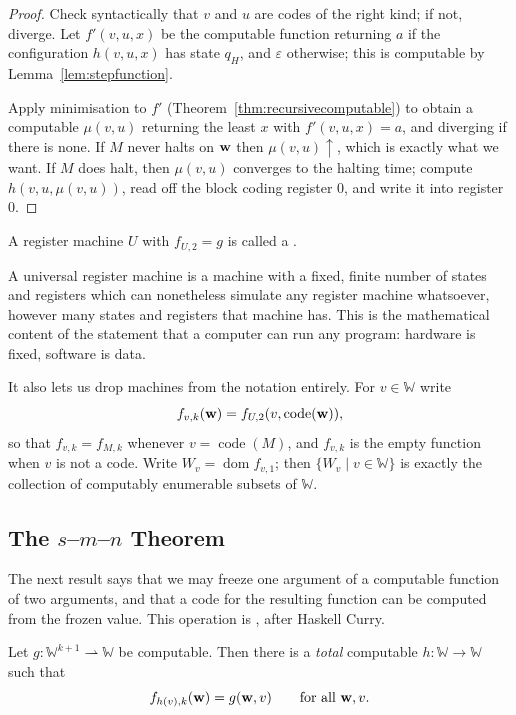 \documentclass[a4paper]{scrartcl}
\newcommand{\WW}{\mathbb{W}}
\newcommand{\dom}{\operatorname{dom}}
\newcommand{\code}{\operatorname{code}}
\newcommand{\eps}{\varepsilon}
\begin{document}
\begin{proof}
	Check syntactically that $v$ and $u$ are codes of the right kind; if not, diverge. Let $f'(v,u,x)$ be the computable function returning $a$ if the configuration $h(v,u,x)$ has state $q_H$, and $\eps$ otherwise; this is computable by Lemma~\ref{lem:stepfunction}.

	Apply minimisation to $f'$ (Theorem~\ref{thm:recursivecomputable}) to obtain a computable $\mu(v,u)$ returning the least $x$ with $f'(v,u,x) = a$, and diverging if there is none. If $M$ never halts on $\mathbf{w}$ then $\mu(v,u)\uparrow$, which is exactly what we want. If $M$ does halt, then $\mu(v,u)$ converges to the halting time; compute $h(v,u,\mu(v,u))$, read off the block coding register $0$, and write it into register $0$.
\end{proof}

\begin{definition}
	A register machine $U$ with $f_{U,2} = g$ is called a .
\end{definition}

A universal register machine is a machine with a fixed, finite number of states and registers which can nonetheless simulate any register machine whatsoever, however many states and registers that machine has. This is the mathematical content of the statement that a computer can run any program: hardware is fixed, software is data.

It also lets us drop machines from the notation entirely. For $v \in \WW$ write
$$f_{v,k}(\vv w) = f_{U,2}(v, \code(\vv w)),$$
so that $f_{v,k} = f_{M,k}$ whenever $v = \code(M)$, and $f_{v,k}$ is the empty function when $v$ is not a code. Write $W_v = \dom f_{v,1}$; then $\{W_v \mid v \in \WW\}$ is exactly the collection of computably enumerable subsets of $\WW$.

\subsection{The \texorpdfstring{$s$--$m$--$n$}{s-m-n} Theorem}

The next result says that we may freeze one argument of a computable function of two arguments, and that a code for the resulting function can be computed from the frozen value. This operation is , after Haskell Curry.

\begin{theorem}\label{thm:smn}
	Let $g \colon \WW^{k+1} \rightharpoonup \WW$ be computable. Then there is a \emph{total} computable $h \colon \WW \to \WW$ such that
	$$f_{h(v),k}(\mathbf{w}) = g(\mathbf{w}, v) \qquad \text{for all } \mathbf{w}, v.$$
\end{theorem}
\end{document}
